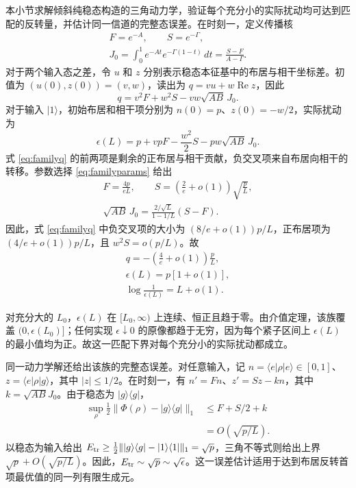 \documentclass[aps,pra,reprint,amsmath,amssymb,nofootinbib,floatfix,longbibliography]{revtex4-2}
\theoremstyle{aps}
\newcommand{\eps}{\epsilon}
\newcommand{\ket}[1]{|#1\rangle}
\newcommand{\bra}[1]{\langle#1|}
\newcommand{\proj}[1]{|#1\rangle\langle#1|}
\begin{document}
本小节求解倾斜纯稳态构造的三角动力学，验证每个充分小的实际扰动均可达到匹配的反转量，并估计同一信道的完整态误差。在时刻一，定义传播核
\begin{equation}\label{eq:familykernels}
 \begin{gathered}
 F=e^{-A},\qquad S=e^{-\Gamma},\\
 J_0=\int_0^1e^{-At}e^{-\Gamma(1-t)}\,dt
 =\frac{S-F}{A-\Gamma}.
 \end{gathered}
\end{equation}
对于两个输入态之差，令 $u$ 和 $z$ 分别表示稳态本征基中的布居与相干坐标差。初值为 $(u(0),z(0))=(v,w)$，读出为 $q=vu+w\operatorname{Re}z$，因此
\begin{equation}\label{eq:familyq}
 q=v^2F+w^2S-vw\sqrt{AB}\,J_0.
\end{equation}
对于输入 $\ket1$，初始布居和相干项分别为 $n(0)=p$、$z(0)=-w/2$，实际扰动为
\begin{equation}\label{eq:actualepsilon}
 \eps(L)=p+vpF-\frac{w^2}{2}S-pw\sqrt{AB}\,J_0.
\end{equation}
式 \eqref{eq:familyq} 的前两项是剩余的正布居与相干贡献，负交叉项来自布居向相干的转移。参数选择 \eqref{eq:familyparams} 给出
\begin{equation}\label{eq:familyasymptotics}
 \begin{gathered}
 F=\frac{4p}{eL},\qquad
 S=\left(\frac2e+o(1)\right)\sqrt{\frac pL},\\
 \sqrt{AB}\,J_0=\frac{2/\sqrt L}{1-1/L}(S-F).
 \end{gathered}
\end{equation}
因此，式 \eqref{eq:familyq} 中负交叉项的大小为
$(8/e+o(1))p/L$，正布居项为
$(4/e+o(1))p/L$，且 $w^2S=o(p/L)$。故
\begin{equation}\label{eq:familylimit}
 \begin{gathered}
 q=-\left(\frac4e+o(1)\right)\frac pL,
 \\ \eps(L)=p[1+o(1)],
 \\ \log\frac1{\eps(L)}=L+o(1).
 \end{gathered}
\end{equation}

对充分大的 $L_0$，$\eps(L)$ 在 $[L_0,\infty)$ 上连续、恒正且趋于零。由介值定理，该族覆盖 $(0,\eps(L_0)]$；任何实现 $\eps\downarrow0$ 的原像都趋于无穷，因为每个紧子区间上 $\eps(L)$ 的最小值均为正。故这一匹配下界对每个充分小的实际扰动都成立。

同一动力学解还给出该族的完整态误差。对任意输入，记 $n=\bra e\rho\ket e\in[0,1]$、$z=\bra e\rho\ket g$，其中 $|z|\le1/2$。在时刻一，有 $n'=Fn$、$z'=Sz-kn$，其中 $k=\sqrt{AB}J_0$。由于稳态为 $\proj g$，
\begin{equation}\label{eq:pure-full-state-bound}
 \begin{split}
 \sup_\rho\tfrac12\|\Phi(\rho)-\proj g\|_1
 &\le F+S/2+k\\
 &=O\!\left(\sqrt{p/L}\right).
 \end{split}
\end{equation}
以稳态为输入给出 $E_{\rm tr}\ge\tfrac12\|\proj g-\proj1\|_1=\sqrt p$，三角不等式则给出上界 $\sqrt p+O(\sqrt{p/L})$。因此，$E_{\rm tr}\sim\sqrt p\sim\sqrt\eps$。这一误差估计适用于达到布居反转首项最优值的同一列有限生成元。
\end{document}
